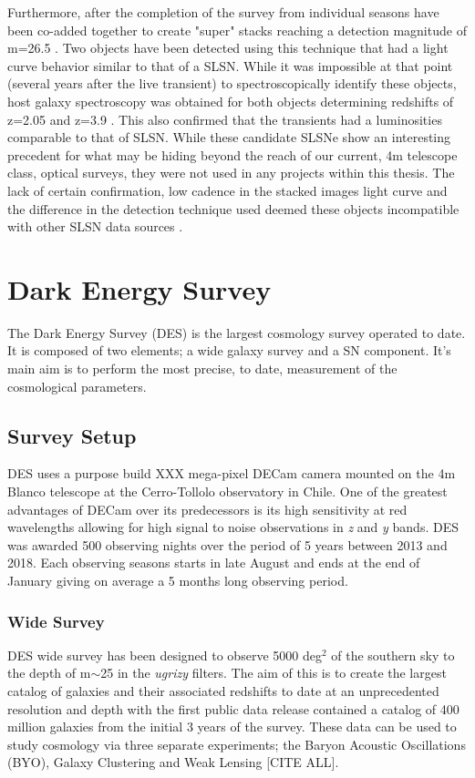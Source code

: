 Furthermore, after the completion of the survey from individual seasons have been co-added together to create "super" stacks reaching a detection magnitude of m=26.5 \citep{Cooke2012}. Two objects have been detected using this technique that had a light curve behavior similar to that of a SLSN. While it was impossible at that point (several years after the live transient) to spectroscopically identify these objects, host galaxy spectroscopy was obtained for both objects determining redshifts of z=2.05 and z=3.9 \citep{Cooke2012}. This also confirmed that the transients had a luminosities comparable to that of SLSN. While these candidate SLSNe show an interesting precedent for what may be hiding beyond the reach of our current, 4m telescope class, optical surveys, they were not used in any projects within this thesis. The lack of certain confirmation, low cadence in the stacked images light curve and the difference in the detection technique used deemed these objects incompatible with other SLSN data sources \citep{Prajs2016}.

\section{Dark Energy Survey}
The Dark Energy Survey (DES) is the largest cosmology survey operated to date. It is composed of two elements; a wide galaxy survey and a SN component. It's main aim is to perform the most precise, to date, measurement of the cosmological parameters.

\subsection{Survey Setup}
DES uses a purpose build XXX mega-pixel DECam camera mounted on the 4m Blanco telescope at the Cerro-Tollolo observatory in Chile. One of the greatest advantages of DECam over its predecessors is its high sensitivity at red wavelengths allowing for high signal to noise observations in \textit{z} and \textit{y} bands. DES was awarded 500 observing nights over the period of 5 years between 2013 and 2018. Each observing seasons starts in late August and ends at the end of January giving on average a 5 months long observing period.

\subsubsection{Wide Survey}
DES wide survey has been designed to observe 5000 deg$^2$ of the southern sky to the depth of m$\sim$25 in the \textit{ugrizy} filters. The aim of this is to create the largest catalog of galaxies and their associated redshifts to date at an unprecedented resolution and depth with the first public data release contained a catalog of 400 million galaxies from the initial 3 years of the survey. These data can be used to study cosmology via three separate experiments; the Baryon Acoustic Oscillations (BYO), Galaxy Clustering and Weak Lensing [CITE ALL].

